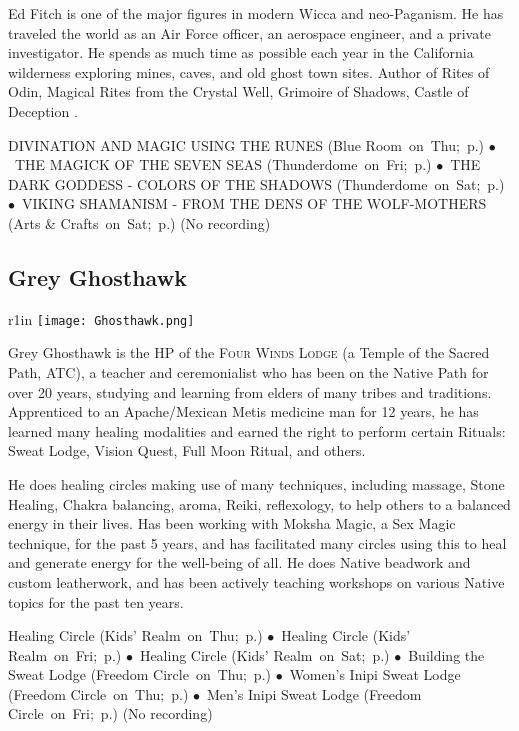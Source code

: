 { Ed Fitch is one of the major figures in modern Wicca and neo-Paganism.  He has traveled the world as an Air Force officer, an aerospace engineer, and a private investigator.  He spends as much time as possible each year in the California wilderness exploring mines, caves, and old ghost town sites.  Author of Rites of Odin, Magical Rites from the Crystal Well, Grimoire of Shadows, Castle of Deception . 

} \hspace{2em} {\footnotesize DIVINATION AND MAGIC USING THE RUNES (Blue Room~on~Thu;~p.\pageref{Thu-Fitch4}) $\bullet$~THE MAGICK OF THE SEVEN SEAS (Thunderdome~on~Fri;~p.\pageref{Fri-Fitch2}) $\bullet$~THE DARK GODDESS - COLORS OF THE SHADOWS (Thunderdome~on~Sat;~p.\pageref{Sat-Fitch3}) $\bullet$~VIKING SHAMANISM - FROM THE DENS OF THE WOLF-MOTHERS (Arts \& Crafts~on~Sat;~p.\pageref{Sat-Fitch1})}
 {\small (No recording)} 


\endgroup

\vspace{6pt}
\subsection{Grey Ghosthawk} 

\begingroup
 \begin{wrapfigure}{r}{1in}
  \texttt{[image: Ghosthawk.png]} %
  \end{wrapfigure}

{ Grey Ghosthawk is the HP of the \textsc{Four Winds Lodge} (a Temple of the Sacred Path, ATC), a teacher and ceremonialist who has been on the Native Path for over 20 years, studying and learning from elders of many tribes and traditions. Apprenticed to an Apache/Mexican Metis medicine man for 12 years, he has learned many healing modalities and earned the right to perform certain Rituals: Sweat Lodge, Vision Quest, Full Moon Ritual, and others. 

He does healing circles making use of many techniques, including massage, Stone Healing, Chakra balancing, aroma, Reiki, reflexology, to help others to a balanced energy in their lives. Has been working with Moksha Magic, a Sex Magic technique, for the past 5 years, and has facilitated many circles using this to heal and generate energy for the well-being of all. He does Native beadwork and custom leatherwork, and has been actively teaching workshops on various Native topics for the past ten years. 

} \hspace{2em} {\footnotesize Healing Circle (Kids' Realm~on~Thu;~p.\pageref{Thu-Healing1}) $\bullet$~Healing Circle (Kids' Realm~on~Fri;~p.\pageref{Fri-Healing2}) $\bullet$~Healing Circle (Kids' Realm~on~Sat;~p.\pageref{Sat-Healing3}) $\bullet$~Building the Sweat Lodge (Freedom Circle~on~Thu;~p.\pageref{Thu-Ghosthawk1}) $\bullet$~Women's Inipi Sweat Lodge (Freedom Circle~on~Thu;~p.\pageref{Thu-sweat-women}) $\bullet$~Men's Inipi Sweat Lodge (Freedom Circle~on~Fri;~p.\pageref{Fri-sweat-men})}
 {\small (No recording)} 


\endgroup

\vspace{6pt}
